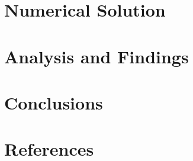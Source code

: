 \documentclass[11pt]{article}
\begin{document}
\smallbreak
\section{Numerical Solution}

\smallbreak
\section{Analysis and Findings}

\smallbreak
\section{Conclusions}

\smallbreak
\section{References}

\newpage
\end{document}
